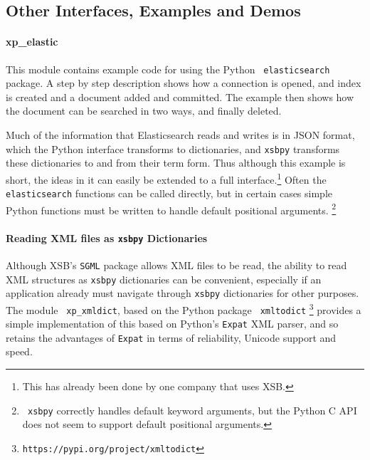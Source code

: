 \begin{description}



\end{description}

\subsection{Other Interfaces, Examples and Demos}

\paragraph{xp\_elastic}
This module contains example code for using the Python {\tt
  elasticsearch} package.  A step by step description shows how a
connection is opened, and index is created and a document added and
committed.  The example then shows how the document can be searched in
two ways, and finally deleted.

Much of the information that Elasticsearch reads and writes is in JSON
format, which the Python interface transforms to dictionaries, and
{\tt xsbpy} transforms these dictionaries to and from their term form.
Thus although this example is short, the ideas in it can easily be
extended to a full interface.\footnote{This has already been done by
  one company that uses XSB.}  Often the {\tt elasticsearch} functions
can be called directly, but in certain cases simple Python functions
must be written to handle default positional arguments. \footnote{{\tt
    xsbpy} correctly handles default keyword arguments, but the Python
  C API does not seem to support default positional arguments.}



\paragraph{Reading XML files as {\tt xsbpy} Dictionaries}
%
Although XSB's {\tt SGML} package allows XML files to be read, the
ability to read XML structures as {\tt xsbpy} dictionaries can be
convenient, especially if an application already must navigate through
{\tt xsbpy} dictionaries for other purposes.  The module {\tt
  xp\_xmldict}, based on the Python package {\tt
  xmltodict} \footnote{{\tt https://pypi.org/project/xmltodict}}
provides a simple implementation of this based on Python's {\tt Expat}
XML parser, and so retains the advantages of {\tt Expat} in terms of
reliability, Unicode support and speed.

